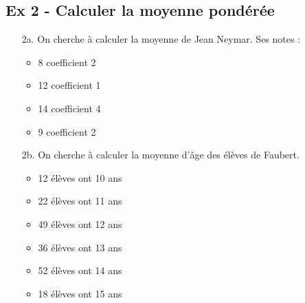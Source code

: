 \begin{multicols}{2}

  \subsection*{Ex 2 - Calculer la moyenne pondérée}

  \begin{enumerate}
  \item[2a.] On cherche à calculer la moyenne de Jean Neymar. Ses notes :\\
  \begin{itemize}[label={$\bullet$}]
    \item 8 coefficient 2
    \item 12 coefficient 1
    \item 14 coefficient 4
    \item 9 coefficient 2
\end{itemize} 

  \item[2b.]  On cherche à calculer la moyenne d'âge des élèves de Faubert. \\
  \begin{itemize}[label={$\bullet$}]
    \item 12 élèves ont 10 ans
    \item 22 élèves ont 11 ans
    \item 49 élèves ont 12 ans
    \item 36 élèves ont 13 ans
    \item 52 élèves ont 14 ans
    \item 18 élèves ont 15 ans
\end{itemize} 
\end{enumerate} 

\columnbreak

\Pointilles[26]

\end{multicols}

\newpage

